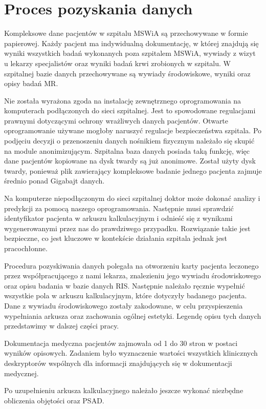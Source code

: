 \documentclass[a4paper,11pt,twoside]{report}
\theoremstyle{definition}
\begin{document}
\section{Proces pozyskania danych}
Kompleksowe dane pacjentów w szpitalu MSWiA są przechowywane w formie papierowej. Każdy pacjent ma indywidualną dokumentację, w której znajdują się wyniki wszystkich badań wykonanych poza szpitalem MSWiA, wywiady z wizyt u lekarzy specjalistów oraz wyniki badań krwi zrobionych w szpitalu. W szpitalnej bazie danych przechowywane są wywiady środowiskowe, wyniki oraz opisy badań MR. 
\par
Nie została wyrażona zgoda na instalację zewnętrznego oprogramowania na komputerach podłączonych do sieci szpitalnej. Jest to spowodowane regulacjami prawnymi dotyczącymi ochrony wrażliwych danych pacjentów. Otwarte oprogramowanie używane mogłoby naruszyć regulacje bezpieczeństwa szpitala. Po podjęciu decyzji o przenoszeniu danych nośnikiem fizycznym należało się skupić na module anonimizującym. Szpitalna baza danych posiada taką funkcję, więc dane pacjentów kopiowane na dysk twardy są już anonimowe. Został użyty dysk twardy, ponieważ plik zawierający kompleksowe badanie jednego pacjenta zajmuje średnio ponad Gigabajt danych. 
\par
Na komputerze niepodłączonym do sieci szpitalnej doktor może dokonać analizy i predykcji za pomocą naszego oprogramowania. Następnie musi sprawdzić identyfikator pacjenta w arkuszu kalkulacyjnym i odnieść się z wynikami wygenerowanymi przez nas do prawdziwego przypadku. Rozwiązanie takie jest bezpieczne, co jest kluczowe w kontekście działania szpitala jednak jest pracochłonne.
\par
Procedura pozyskiwania danych polegała na otworzeniu karty pacjenta leczonego przez współpracującego z nami lekarza, znalezieniu jego wywiadu środowiskowego oraz opisu badania w bazie danych RIS. Następnie należało ręcznie wypełnić wszystkie pola w arkuszu kalkulacyjnym, które dotyczyły badanego pacjenta. Dane z wywiadu środowiskowego zostały zakodowane, w celu przyspieszenia wypełniania arkusza oraz zachowania ogólnej estetyki. Legendę opisu tych danych przedstawimy w dalszej części pracy. 
\par
Dokumentacja medyczna pacjentów zajmowała od 1 do 30 stron w postaci wyników opisowych.  Zadaniem było wyznaczenie wartości wszystkich klinicznych deskryptorów wspólnych dla informacji znajdujących się w dokumentacji medycznej. 
\par
Po uzupełnieniu arkusza kalkulacyjnego należało jeszcze wykonać niezbędne obliczenia objętości oraz PSAD. 
\end{document}
